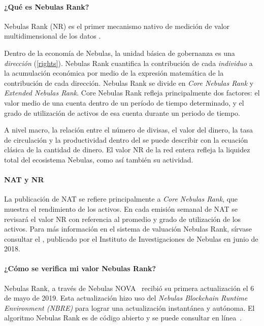 \begin{center}
	\colorbox{yellow!30}{
	\begin{minipage}[c]{.8\textwidth}
		\paragraph{¿Qué es Nebulas Rank?}
		Nebulas Rank (NR) es el primer mecanismo nativo \onchain de medición de valor multidimensional de los datos \blockchain.

		Dentro de la economía de Nebulas, la unidad básica de gobernanza es una \emph{dirección}
		(\ref{rights}). Nebulas Rank cuantifica la contribución de cada
		\emph{individuo} a la acumulación económica por medio de la expresión matemática de la contribución de cada dirección. Nebulas Rank se divide en \emph{Core
		Nebulas Rank} y \emph{Extended Nebulas Rank}. Core Nebulas Rank refleja principalmente dos factores: el valor medio de una cuenta dentro de un período de tiempo determinado, y el grado de utilización de activos de esa cuenta durante un periodo de tiempo.

		A nivel macro, la relación entre el número de divisas, el valor del dinero, la tasa de circulación y la productividad dentro del \blockchain se puede describir con la ecuación clásica de la cantidad de dinero. El valor NR de la red entera refleja la liquidez total del ecosistema Nebulas, como así también su actividad.

		\paragraph{NAT y NR}

		La publicación de NAT se refiere principalmente a \emph{Core Nebulas Rank}, que muestra el rendimiento de los activos. En cada emisión semanal de NAT se revisará el valor NR con referencia al promedio y grado de utilización de los activos. Para más información en el sistema de valuación Nebulas Rank, sírvase consultar el \yellowp, publicado por el Instituto de Investigaciones de Nebulas en junio de 2018.

		\paragraph{¿Cómo se verifica mi valor Nebulas Rank?}

		Nebulas Rank, a través de Nebulas NOVA~\cite{nova} recibió su primera actualización el 6 de mayo de 2019. Esta actualización hizo uso del \textit{Nebulas Blockchain Runtime Environment (NBRE)} para lograr una actualización instantánea y autónoma. El algoritmo Nebulas Rank es de código abierto y se puede consultar en línea~\cite{CheckNR}.

	\end{minipage}}
\end{center}

